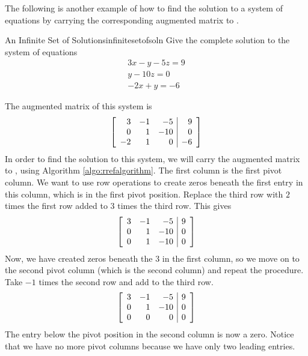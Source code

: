 The following is another example of how to find the solution to a system of equations by carrying the corresponding
augmented matrix to \rref. 

\begin{example}{An Infinite Set of Solutions}{infinitesetofsoln}
Give the complete solution to the system of equations \:
\begin{equation}
\begin{array}{c}
3x-y-5z=9 \\
y-10z=0 \\
-2x+y=-6
\end{array}
\end{equation}
\end{example}

\begin{solution} The augmented matrix of this system is
\begin{equation*}
\left[
\begin{array}{rrr|r}
 3 & -1 &  -5 & 9 \\
 0 &  1 & -10 & 0 \\
-2 &  1 &   0 & -6
\end{array}
\right]
\end{equation*}
In order to find the solution to this system, we will carry the augmented matrix to \rref, using Algorithm \ref{algo:rrefalgorithm}.
The first column is the first pivot column. We want to use row operations to create zeros beneath the first entry in this column, which is 
in the first pivot position. 
Replace the third row with $2$ times the first row added to $3$ times the
third row. This gives
\begin{equation*}
\left[
\begin{array}{rrr|r}
3 & -1 & -5 & 9 \\
0 & 1 & -10 & 0 \\
0 & 1 & -10 & 0
\end{array}
\right] 
\end{equation*}
Now, we have created zeros beneath the $3$ in the first column, so we move on to the second pivot column (which is the second column) and repeat the procedure. 
Take $-1$ times the second row and add to the third row.
\begin{equation*}
\left[
\begin{array}{rrr|r}
3 & -1 &  -5 & 9 \\
0 &  1 & -10 & 0 \\
0 &  0 &   0 & 0
\end{array}
\right]
\end{equation*}
The entry below the pivot position in the second column is now a zero. Notice that we have no more pivot columns because we 
have only two leading entries. 



\end{solution}
